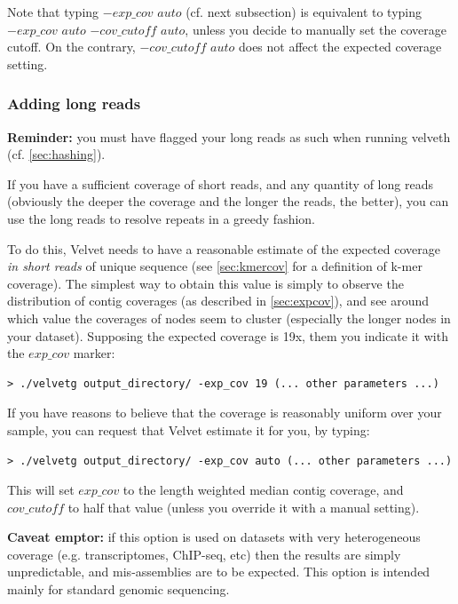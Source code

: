 \documentclass{article}
\begin{document}
Note that typing $-exp\_cov$ $auto$ (cf. next subsection) is equivalent to typing $-exp\_cov$ $auto$ $-cov\_cutoff$ $auto$, unless you decide to manually set the coverage cutoff. On the contrary, $-cov\_cutoff$ $auto$ does not affect the expected coverage setting.

	\subsubsection{Adding long reads}
	
\textbf{Reminder:} you must have flagged your long reads as such when running
velveth (cf. \ref{sec:hashing}).
	
If you have a sufficient coverage of short reads, and any quantity of long reads (obviously the deeper the coverage and the longer the reads, the better), you can use the long reads to resolve repeats in a greedy fashion. 

To do this, Velvet needs to have a reasonable estimate of the expected coverage \emph{in short reads} of unique sequence (see \ref{sec:kmercov} for a definition of k-mer coverage). The simplest way to obtain this value is simply to observe the distribution of contig coverages (as described in \ref{sec:expcov}), and see around which value the coverages of nodes seem to cluster (especially the longer nodes in your dataset). Supposing the expected coverage is 19x, them you indicate it with the $exp\_cov$ marker:

\begin{verbatim}
> ./velvetg output_directory/ -exp_cov 19 (... other parameters ...)
\end{verbatim}

If you have reasons to believe that the coverage is reasonably uniform over your sample, you can request that Velvet estimate it for you, by typing:

\begin{verbatim}
> ./velvetg output_directory/ -exp_cov auto (... other parameters ...)
\end{verbatim}

This will set $exp\_cov$ to the length weighted median contig coverage, and $cov\_cutoff$ to half that value (unless you override it with a manual setting).

\textbf{Caveat emptor:} if this option is used on datasets with very heterogeneous coverage (e.g. transcriptomes, ChIP-seq, etc) then the results are simply unpredictable, and mis-assemblies are to be expected. This option is intended mainly for standard genomic sequencing.
\end{document}
